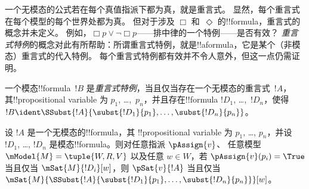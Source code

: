 \documentclass[../../../include/open-logic-section]{subfiles}
\begin{document}


\begin{explain}
一个无模态的公式若在每个真值指派下都为真，就是重言式。
显然，每个重言式在每个模型的每个世界处都为真。
但对于涉及 $\Box$ 和~$\Diamond$ 的!!{formula}，重言式的概念并未定义。
例如，$\Box p \lor \lnot \Box p$——排中律的一个特例——是否有效？
\emph{重言式特例}的概念对此有所帮助：所谓重言式特例，就是!!a{formula}，它是某个（非模态）重言式的代入特例。
每个重言式特例都有效并不令人意外，但这一点仍需证明。
\end{explain}

\begin{defn}
  一个模态!!{formula}~$!B$ 是\emph{重言式特例}，当且仅当存在一个无模态的重言式~$!A$，其!!{propositional variable}
  为 $p_1$, \dots,~$p_n$，并且存在!!{formula} $!D_1$,
  \dots,~$!D_n$，使得 $!B \ident \SSubst{!A}{\subst{!D_1}{p_1},
    \dots, \subst{!D_n}{p_n}}$。
\end{defn}

\begin{lem}
  设 $!A$ 是一个无模态的!!{formula}，其 !!{propositional
  variable} 为 $p_1$, \dots, $p_n$，并设 $!D_1$, \dots,
  $!D_n$ 是模态!!{formula}。则对任意指派 $\pAssign{v}$、
  任意模型 $\mModel{M} = \tuple{W, R, V}$ 以及任意 $w \in W$，若
  $\pAssign{v}(p_i) = \True$ 当且仅当 $\mSat{M}{!D_i}[w]$，则
  $\pSat{v}{!A}$ 当且仅当
  $\mSat{M}{\SSubst{!A}{\subst{!D_1}{p_1}, \dots,
      \subst{!D_n}{p_n}}}[w]$。
\end{lem}
\end{document}
